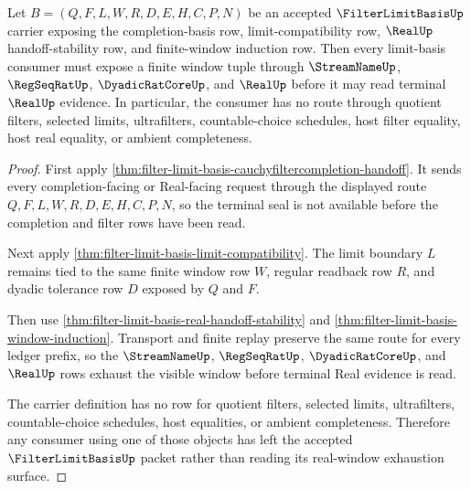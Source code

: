 \begin{theorem}
\label{thm:filter-limit-basis-real-window-exhaustion}
Let $B=(Q,F,L,W,R,D,E,H,C,P,N)$ be an accepted $\FilterLimitBasisUp$ carrier exposing the completion-basis row, limit-compatibility row, $\RealUp$ handoff-stability row, and finite-window induction row. Then every limit-basis consumer must expose a finite window tuple through $\StreamNameUp$, $\RegSeqRatUp$, $\DyadicRatCoreUp$, and $\RealUp$ before it may read terminal $\RealUp$ evidence. In particular, the consumer has no route through quotient filters, selected limits, ultrafilters, countable-choice schedules, host filter equality, host real equality, or ambient completeness.
\end{theorem}
\begin{proof}
First apply \autoref{thm:filter-limit-basis-cauchyfiltercompletion-handoff}. It sends every completion-facing or Real-facing request through the displayed route $Q,F,L,W,R,D,E,H,C,P,N$, so the terminal seal is not available before the completion and filter rows have been read.

Next apply \autoref{thm:filter-limit-basis-limit-compatibility}. The limit boundary $L$ remains tied to the same finite window row $W$, regular readback row $R$, and dyadic tolerance row $D$ exposed by $Q$ and $F$.

Then use \autoref{thm:filter-limit-basis-real-handoff-stability} and \autoref{thm:filter-limit-basis-window-induction}. Transport and finite replay preserve the same route for every ledger prefix, so the $\StreamNameUp$, $\RegSeqRatUp$, $\DyadicRatCoreUp$, and $\RealUp$ rows exhaust the visible window before terminal Real evidence is read.

The carrier definition has no row for quotient filters, selected limits, ultrafilters, countable-choice schedules, host equalities, or ambient completeness. Therefore any consumer using one of those objects has left the accepted $\FilterLimitBasisUp$ packet rather than reading its real-window exhaustion surface.
\end{proof}

